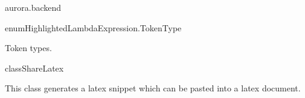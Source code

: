 \begin{texdocpackage}{aurora.backend}
\begin{texdocclass}{enum}{HighlightedLambdaExpression.TokenType}
\label{texdoclet:aurora.backend.HighlightedLambdaExpression.TokenType}
\begin{texdocclassintro}
Token types.\end{texdocclassintro}
\begin{texdocenums}
\end{texdocenums}
\begin{texdocclassmethods}
\end{texdocclassmethods}
\end{texdocclass}


\begin{texdocclass}{class}{ShareLatex}
\label{texdoclet:aurora.backend.ShareLatex}
\begin{texdocclassintro}
This class generates a latex snippet which can be pasted into a latex document.\end{texdocclassintro}
\begin{texdocclassconstructors}
\end{texdocclassconstructors}
\begin{texdocclassmethods}
\end{texdocclassmethods}
\end{texdocclass}



\end{texdocpackage}
